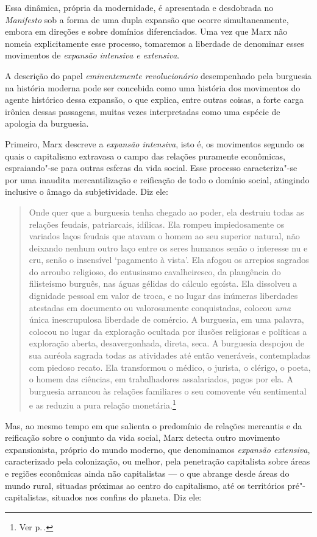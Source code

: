 Essa dinâmica, própria da modernidade, é apresentada e desdobrada no
\textit{Manifesto} sob a forma de uma dupla expansão que ocorre
simultaneamente, embora em direções e sobre domínios diferenciados. Uma
vez que Marx não nomeia explicitamente esse processo, tomaremos a
liberdade de denominar esses movimentos de \textit{expansão intensiva e extensiva}.

A descrição do papel \textit{eminentemente revolucionário} desempenhado pela
burguesia na história moderna pode ser concebida como uma história dos
movimentos do agente histórico dessa expansão, o que explica, entre
outras coisas, a forte carga irônica dessas passagens, muitas vezes
interpretadas como uma espécie de apologia da burguesia.

Primeiro, Marx descreve a \textit{expansão intensiva}, isto é, os movimentos
segundo os quais o capitalismo extravasa o campo das relações puramente
econômicas, espraiando"-se para outras esferas da vida social. Esse
processo caracteriza"-se por uma inaudita mercantilização e reificação
de todo o domínio social, atingindo inclusive o âmago da subjetividade.
Diz ele: 

\begin{quote} 
Onde quer que a burguesia tenha chegado ao poder, ela destruiu todas as
relações feudais, patriarcais, idílicas. Ela rompeu impiedosamente os
variados laços feudais que atavam o homem ao seu superior natural,
não deixando nenhum outro laço entre os seres humanos senão o interesse
nu e cru, senão o insensível ‘pagamento à vista’. Ela afogou os
arrepios sagrados do arroubo religioso, do entusiasmo cavalheiresco, da
plangência do filisteísmo burguês, nas águas gélidas do cálculo
egoísta. Ela dissolveu a dignidade pessoal em valor de troca, e no
lugar das inúmeras liberdades atestadas em documento ou valorosamente
conquistadas, colocou \textit{uma} única inescrupulosa liberdade de
comércio. A burguesia, em uma palavra, colocou no lugar da exploração
ocultada por ilusões religiosas e políticas a exploração aberta,
desavergonhada, direta, seca. A burguesia despojou de sua auréola
sagrada todas as atividades até então veneráveis, contempladas com
piedoso recato. Ela transformou o médico, o jurista, o clérigo, o
poeta, o homem das ciências, em trabalhadores assalariados, pagos por ela.
A burguesia arrancou às relações familiares o seu comovente véu
sentimental e as reduziu a pura relação monetária.\footnote{Ver p.\,\pageref{3}.}
\end{quote} 

Mas, ao mesmo tempo em que salienta o predomínio de relações mercantis e
da reificação sobre o conjunto da vida social, Marx detecta outro
movimento expansionista, próprio do mundo moderno, que denominamos
\textit{expansão extensiva}, caracterizado pela colonização, ou melhor, pela
penetração capitalista sobre áreas e regiões econômicas ainda não
capitalistas --- o que abrange desde áreas do mundo rural, situadas
próximas ao centro do capitalismo, até os territórios
pré"-capitalistas, situados nos confins do planeta. Diz ele:


